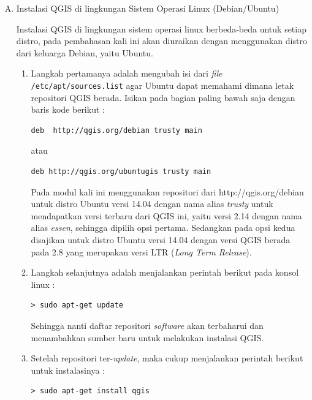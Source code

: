 \begin{enumerate}[A.]
\begin{enumerate}[1.]
\end{enumerate}

\item Instalasi QGIS di lingkungan Sistem Operasi Linux (Debian/Ubuntu)

Instalasi QGIS di lingkungan sistem operasi linux berbeda-beda untuk setiap distro, pada pembahasan kali ini akan diuraikan dengan menggunakan distro dari keluarga Debian, yaitu Ubuntu.

\begin{enumerate}[1.]

\item Langkah pertamanya adalah mengubah isi dari \textit{file} \verb|/etc/apt/sources.list| agar Ubuntu dapat memahami dimana letak repositori QGIS berada. Isikan pada bagian paling bawah saja dengan baris kode berikut :

\begin{verbatim}
deb  http://qgis.org/debian trusty main
\end{verbatim}

atau 

\begin{verbatim}
deb http://qgis.org/ubuntugis trusty main
\end{verbatim}

Pada modul kali ini menggunakan repositori dari http://qgis.org/debian untuk distro Ubuntu versi 14.04 dengan nama alias \textit{trusty} untuk mendapatkan versi terbaru dari QGIS ini, yaitu versi 2.14 dengan nama alias \textit{essen}, sehingga dipilih opsi pertama. Sedangkan pada opsi kedua disajikan untuk distro Ubuntu versi 14.04 dengan versi QGIS berada pada 2.8 yang merupakan versi LTR (\textit{Long Term Release}).

\item Langkah selanjutnya adalah menjalankan perintah berikut pada konsol linux :

\begin{verbatim}
> sudo apt-get update
\end{verbatim}

Sehingga nanti daftar repositori \textit{software} akan terbaharui dan menambahkan sumber baru untuk melakukan instalasi QGIS.

\item Setelah repositori ter-\textit{update}, maka cukup menjalankan perintah berikut untuk instalasinya :

\begin{verbatim}
> sudo apt-get install qgis
\end{verbatim}


\end{enumerate}
\end{enumerate}
